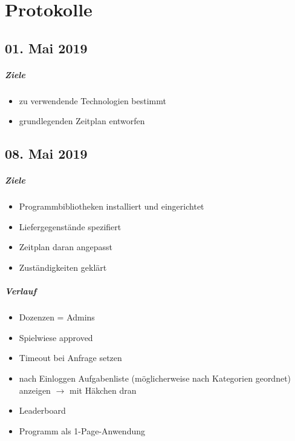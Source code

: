 \chapter{Protokolle}

\section*{01. Mai 2019}
\paragraph{Ziele}
\begin{itemize}
  \item[\check] zu verwendende Technologien bestimmt
  \item[\check] grundlegenden Zeitplan entworfen
\end{itemize}

\section*{08. Mai 2019}
\paragraph{Ziele}
\begin{itemize}
  \item[\check] Programmbibliotheken installiert und eingerichtet
  \item[\check] Liefergegenstände spezifiert
  \item[\check] Zeitplan daran angepasst
  \item[\check] Zuständigkeiten geklärt
\end{itemize}

\paragraph{Verlauf}
\begin{itemize}
  \item Dozenzen = Admins
  \item Spielwiese approved
  \item Timeout bei Anfrage setzen
  \item nach Einloggen Aufgabenliste (möglicherweise nach Kategorien geordnet) anzeigen $\rightarrow$ mit Häkchen dran
  \item Leaderboard
  \item Programm als 1-Page-Anwendung
\end{itemize}

